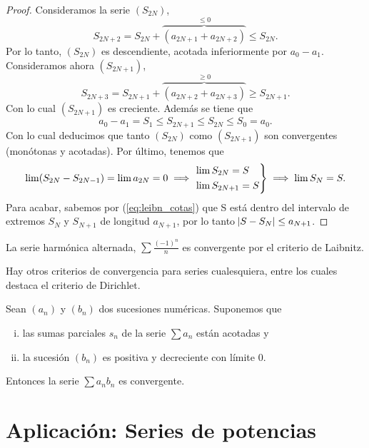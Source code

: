 \begin{proof}
    Consideramos la serie $(S_{2N})$,
    \[
        S_{2N+2} = S_{2N} + \overbrace{(a_{2N+1} + a_{2N+2})}^{\leq 0} \leq S_{2N}.
    \]
    Por lo tanto, $(S_{2N})$ es descendiente, acotada inferiormente por $a_0 - a_1$.
    Consideramos ahora $(S_{2N+1})$,
    \[
        S_{2N+3} = S_{2N+1} + \overbrace{(a_{2N+2} + a_{2N+3})}^{\geq 0} \geq S_{2N+1}.
    \]
    Con lo cual $(S_{2N+1})$ es creciente. Además se tiene que
    \begin{equation}\label{eq:leibn_cotas}
        a_0 - a_1 = S_1 \leq S_{2N+1} \leq S_{2N} \leq S_0 = a_0.
    \end{equation}
    Con lo cual deducimos que tanto $(S_{2N})$ como $(S_{2N+1})$ son convergentes
    (monótonas y acotadas). Por último, tenemos que
    \[
        \lim (S_{2N} - S_{2N-1}) = \lim a_{2N} = 0 \implies \begin{rcases}
            \lim S_{2N} = S \\ \lim S_{2N+1} = S
        \end{rcases} \implies \lim S_N = S.
    \]
    Para acabar, sabemos por (\ref{eq:leibn_cotas}) que S está dentro del intervalo
    de extremos $S_{N}$ y $S_{N+1}$ de longitud $a_{N+1}$, por lo tanto
    $\abs{S - S_N} \leq a_{N+1}$.
\end{proof}

\begin{example*}
    La serie harmónica alternada, $\sum \frac{(-1)^n}{n}$ es convergente por el
    criterio de Laibnitz.
\end{example*}

\noindent Hay otros criterios de convergencia para series cualesquiera, entre los cuales
destaca el criterio de Dirichlet.

\begin{prop}
    Sean $(a_n)$ y $(b_n)$ dos sucesiones numéricas. Suponemos que
    \begin{enumerate}[i)]
        \item las sumas parciales $s_n$ de la serie $\sum a_n$ están acotadas y
        \item la sucesión $(b_n)$ es positiva y decreciente con límite 0.
    \end{enumerate}
    Entonces la serie $\sum a_nb_n$ es convergente.
\end{prop}

\section{Aplicación: Series de potencias}


